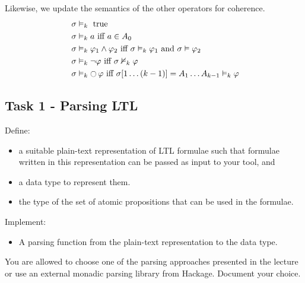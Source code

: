 \documentclass{article}
\begin{document}
Likewise, we update the semantics of the other operators for coherence.
\begin{align*}
    &\; \sigma \vDash_k \text{ true} \\
    &\; \sigma \vDash_k a \text{ iff } a \in A_0 \\
    &\; \sigma \vDash_k \varphi_1 \land \varphi_2 \text{ iff } \sigma \vDash_k \varphi_1 \text{ and } \sigma \vDash \varphi_2 \\
    &\; \sigma \vDash_k \neg \varphi \text{ iff } \sigma \nvDash_k \varphi \\
    &\; \sigma \vDash_k \mathop{\ocircle}{\varphi} \text{ iff } \sigma [1 \dots (k-1)] = A_1 \dots A_{k-1} \vDash_k \varphi \\
\end{align*}

\subsection*{Task 1 - Parsing LTL}
Define:
\begin{itemize}
    \item a suitable plain-text representation of LTL formulae such that formulae written in this representation can be passed as input to your tool, and
    \item a data type to represent them. 
    \item the type of the set of atomic propositions that can be used in the formulae.
\end{itemize}
Implement: 
\begin{itemize}
    \item A parsing function from the plain-text representation to the data type.
\end{itemize}

You are allowed to choose one of the parsing approaches presented in the lecture or 
use an external monadic parsing library from Hackage. Document your choice.
\end{document}
